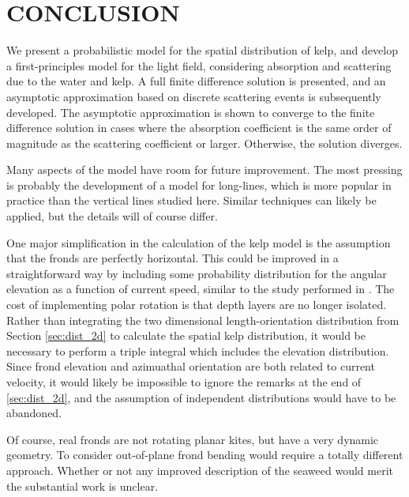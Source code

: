 \chapter{CONCLUSION}
\label{chap:conclusion}

We present a probabilistic model for the spatial distribution of kelp, and develop a first-principles model for the light field, considering absorption and scattering due to the water and kelp.
A full finite difference solution is presented, and an asymptotic approximation based on discrete scattering events is subsequently developed.
The asymptotic approximation is shown to converge to the finite difference solution in cases where the absorption coefficient is the same order
of magnitude as the scattering coefficient or larger.
Otherwise, the solution diverges.

Many aspects of the model have room for future improvement.
The most pressing is probably the development of a model for long-lines, which
is more popular in practice than the vertical lines studied here.
Similar techniques can likely be applied, but the details will of course differ.

One major simplification in the calculation of the kelp model
is the assumption that the fronds are perfectly horizontal.
This could be improved in a straightforward way by including some
probability distribution for the angular elevation as a function of current speed,
similar to the study performed in \citep{norvik_design_2017}.
The cost of implementing polar rotation is that depth layers are no longer isolated.
Rather than integrating the two dimensional length-orientation distribution from
Section \ref{sec:dist_2d} to calculate the spatial kelp distribution,
it would be necessary to perform a triple integral which includes the elevation distribution.
Since frond elevation and azimuathal orientation are both related to current velocity,
it would likely be impossible to ignore the remarks at the end of \ref{sec:dist_2d}, and the
assumption of independent distributions would have to be abandoned.

Of course, real fronds are not rotating planar kites, but have a very dynamic geometry.
To consider out-of-plane frond bending would require a totally different approach.
Whether or not any improved description of the seaweed would merit the substantial work is unclear.
